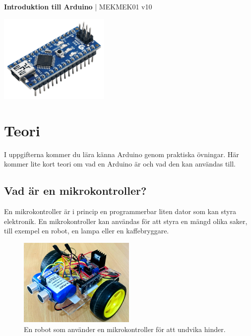 \documentclass[11pt]{article}
\begin{document}
\begin{center}
      \textbf{\huge{Introduktion till Arduino}}
      \huge{| MEKMEK01 v10}
\end{center}
\vspace{2em}

\begin{center}
      \includegraphics[width=0.4\textwidth]{nano}
\end{center}

\tableofcontents

\newpage
\raggedright{}
\section{Teori}
I uppgifterna kommer du lära känna Arduino genom praktiska övningar. Här kommer
lite kort teori om vad en Arduino är och vad den kan användas till.

\subsection{Vad är en mikrokontroller?}
En mikrokontroller är i princip en programmerbar liten dator som kan styra
elektronik. En mikrokontroller kan användas för att styra en mängd olika saker,
till exempel en robot, en lampa eller en kaffebryggare.
\begin{figure}[H]
      \centering
      \includegraphics[width=0.5\textwidth]{obstacle_robot}
      \caption{En robot som använder en mikrokontroller för att undvika
            hinder.}
      \label{fig:obstacle_robot}
\end{figure}
\end{document}
